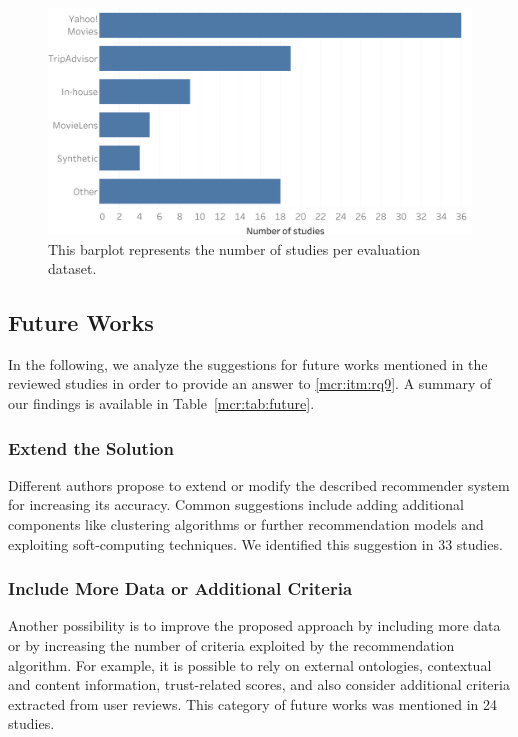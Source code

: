\begin{figure}
\centering
\includegraphics[width=\textwidth]{dataset_per_study}
\caption[Studies per evaluation dataset]{This barplot represents the number of studies per evaluation dataset.}
\label{mcr:fig:dataset-per-study}
\end{figure}

\subsection{Future Works}
\label{mcr:sec:future}

In the following, we analyze the suggestions for future works mentioned in the reviewed studies in order to provide an answer to \ref{mcr:itm:rq9}. A summary of our findings is available in Table~\ref{mcr:tab:future}.

\subsubsection{Extend the Solution}

Different authors propose to extend or modify the described recommender system for increasing its accuracy.  Common suggestions include adding additional components like clustering algorithms or further recommendation models and exploiting soft-computing techniques. We identified this suggestion in 33 studies.

\subsubsection{Include More Data or Additional Criteria}

Another possibility is to improve the proposed approach by including more data or by increasing the number of criteria exploited by the recommendation algorithm. For example, it is possible to rely on external ontologies, contextual and content information, trust-related scores, and also consider additional criteria extracted from user reviews. This category of future works was mentioned in 24 studies.


